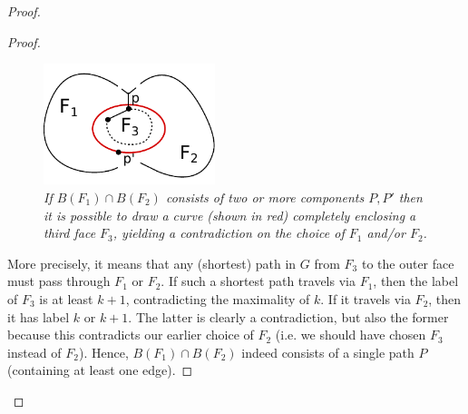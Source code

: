 \begin{proof}
\begin{proof}
\begin{figure}[h]
\begin{center}
\includegraphics[width=5cm]{../figs/ch5/curve.pdf}
\end{center}
\caption{\emph{If $B(F_1) \cap B(F_2)$ consists of two or more components $P, P'$ then it is possible to draw a curve (shown in red) completely enclosing a third face $F_3$, yielding a contradiction on the choice of $F_1$ and/or $F_2$.}}
\label{fig:curve}
\end{figure}

More precisely, it means that any (shortest) path in $G$ from $F_3$ to the outer face must pass through $F_1$ or $F_2$. If such a shortest path travels via $F_1$, then the label
of $F_3$ is at least $k+1$, contradicting the maximality of $k$. If it travels via $F_2$, then it has label $k$ or $k+1$. The latter is clearly a contradiction, but also the former because this contradicts our earlier choice of $F_2$ (i.e. we should have chosen $F_3$ instead of $F_2$). Hence, $B(F_1) \cap B(F_2)$ indeed consists of a single path $P$ (containing at least one edge).


\end{proof}
\end{proof}
